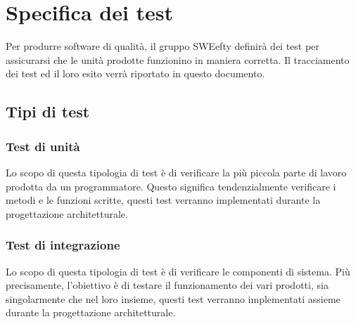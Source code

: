 \section{Specifica dei test}
Per produrre software di qualità, il gruppo SWEefty definirà dei test per assicurarsi che le unità prodotte funzionino in maniera corretta. Il tracciamento dei test ed il loro esito verrà riportato in questo documento.
	\subsection{Tipi di test}
		
	\subsubsection{Test di unità}
    Lo scopo di questa tipologia di test è di verificare la più piccola parte di lavoro prodotta da un programmatore. Questo significa tendenzialmente verificare i metodi e le funzioni scritte, questi test verranno implementati durante la progettazione architetturale.
	
	\subsubsection{Test di integrazione}
	Lo scopo di questa tipologia di test è di verificare le componenti di sistema. Più	precisamente, l’obiettivo è di testare il funzionamento dei vari  prodotti, sia singolarmente che nel loro insieme, questi test verranno implementati assieme durante la progettazione architetturale.
		
		
